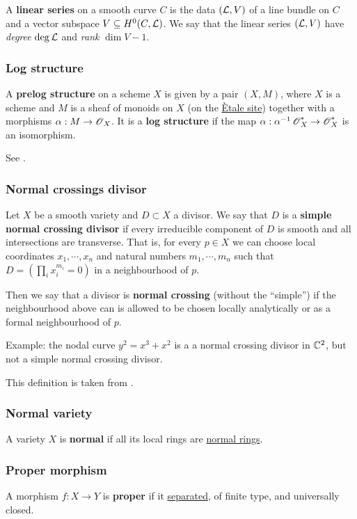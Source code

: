 \documentclass[11pt, english]{article}
\begin{document}
A \textbf{linear series} on a smooth curve $C$ is the data $(\mathcal{L},V)$ of a line bundle on $C$ and a vector subspace $V \subseteq H^0(C,\mathcal{L})$. We say that the linear series $(\mathcal{L},V)$ have \emph{degree} $\deg \mathcal{L}$ and \emph{rank} $\dim V - 1$. 

\subsubsection{Log structure}
\label{logstructure}

A \textbf{prelog structure} on a scheme $X$ is given by a pair $(X,M)$, where $X$ is a scheme and $M$ is a sheaf of monoids on $X$ (on the \hyperref[etalesite]{Ètale site}) together with a morphisms $\alpha:M \to \operatorname{\mathscr{O}}_X$. It is a \textbf{log structure} if the map $\alpha:\alpha^{-1}\operatorname{\mathscr{O}}_X^\ast \to \operatorname{\mathscr{O}}_X^\ast$ is an isomorphism.

See \cite{kato_log}.

\subsubsection{Normal crossings divisor}
\label{normalcrossingsdivisor}

Let $X$ be a smooth variety and $D \subset X$ a divisor. We say that $D$ is a \textbf{simple normal crossing divisor} if every irreducible component of $D$ is smooth and all intersections are transverse. That is, for every $p \in X$ we can choose local coordinates $x_1,\cdots,x_n$ and natural numbers $m_1,\cdots,m_n$ such that $D=\left( \prod_{i} x_i^{m_i} =0 \right)$ in a neighbourhood of $p$.

Then we say that a divisor is \textbf{normal crossing} (without the ``simple'') if the neighbourhood above can is allowed to be chosen locally analytically or as a formal neighbourhood of $p$.

Example: the nodal curve $y^2=x^3+x^2$ is a a normal crossing divisor in $\mathbb{C}^2$, but not a simple normal crossing divisor.

This definition is taken from \cite{kollar_resolution}. 


\subsubsection{Normal variety}
\label{normalvariety}
A variety $X$ is \textbf{normal} if all its local rings are \hyperref[normalring]{normal rings}.

\subsubsection{Proper morphism}
\label{proper}
A morphism $f:X \to Y$ is \textbf{proper} if it \hyperref[separated]{separated}, of finite type, and universally closed.
\end{document}
